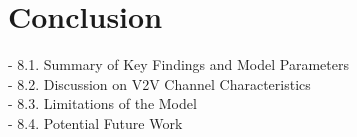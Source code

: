 \chapter{Conclusion}
- 8.1. Summary of Key Findings and Model Parameters\\
- 8.2. Discussion on V2V Channel Characteristics\\
- 8.3. Limitations of the Model\\
- 8.4. Potential Future Work\\
